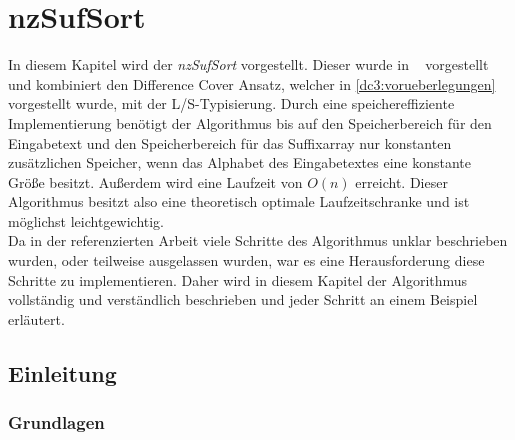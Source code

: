 \section{nzSufSort}
\label{algorithm:nzSufSort}

In  diesem Kapitel wird der \emph{nzSufSort} vorgestellt. Dieser wurde in ~\cite{saca:10} vorgestellt und kombiniert den Difference Cover Ansatz, welcher in \cref{dc3:vorueberlegungen} vorgestellt wurde, mit der L/S-Typisierung. Durch eine speichereffiziente Implementierung benötigt der Algorithmus bis auf den Speicherbereich für den Eingabetext und den Speicherbereich für das Suffixarray nur konstanten zusätzlichen Speicher, wenn das Alphabet des Eingabetextes eine konstante Größe besitzt. Außerdem wird eine Laufzeit von $O(n)$ erreicht. Dieser Algorithmus besitzt also eine theoretisch optimale Laufzeitschranke und ist möglichst leichtgewichtig. \\
Da in der referenzierten Arbeit viele Schritte des Algorithmus unklar beschrieben wurden, oder teilweise ausgelassen wurden, war es eine Herausforderung diese Schritte zu implementieren. Daher wird in diesem Kapitel der Algorithmus vollständig und verständlich beschrieben und jeder Schritt an einem Beispiel erläutert. \\

\subsection{Einleitung}

\subsubsection{Grundlagen}

